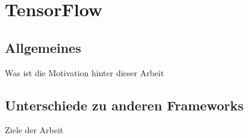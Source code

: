 \chapter{TensorFlow}
\label{chap:tensorflow}



\section{Allgemeines}
\label{sec:allgemeines}
Was ist die Motivation hinter dieser Arbeit

\section{Unterschiede zu anderen Frameworks}
\label{sec:unterschiede}
Ziele der Arbeit